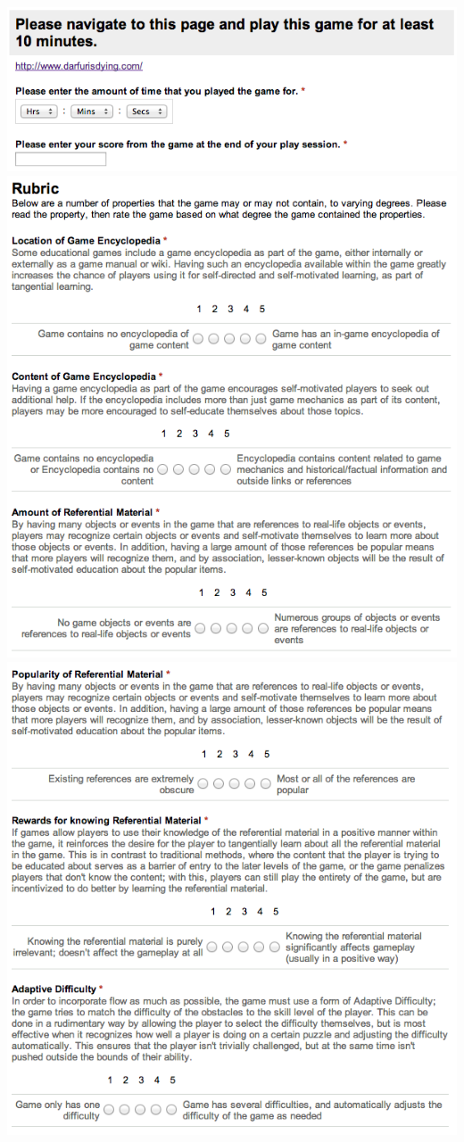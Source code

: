 		\includegraphics[width = \textwidth]{img/survey4.png}
		\includegraphics[width = \textwidth]{img/survey5.png}
		\includegraphics[width = \textwidth]{img/survey6.png}
